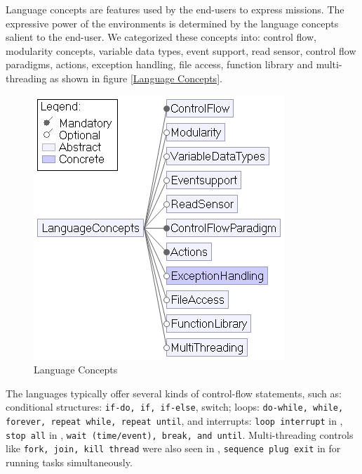 Language concepts  are features used by the end-users to express missions. 
The expressive power of the environments is determined by the language concepts salient to the end-user. We categorized these concepts into: control flow, modularity concepts, variable data types, event support, read sensor, control flow paradigms, actions, exception handling, file access, function  library and multi-threading as shown in figure \ref{Language Concepts}.  

\begin{figure}[t]
     \centering
    \includegraphics[width=\columnwidth]{LanguageConcepts.png}
      \caption{Language Concepts}
      \label{fig:langconcepts}
   \end{figure}

 The languages typically offer several kinds of control-flow statements, such as: conditional structures: \texttt{if-do, if, if-else}, switch; loops: \texttt{do-while, while, forever, repeat while, repeat until}, and  interrupts: \texttt{loop interrupt} in \lego, \texttt{stop all} in \tello, \texttt{wait (time/event), break, and until}.
Multi-threading controls like \texttt{fork, join, kill thread} were also seen in \trik, \texttt{sequence plug exit} in \lego for running tasks simultaneously.

